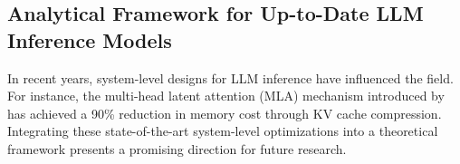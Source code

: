 \subsection{Analytical Framework for Up-to-Date LLM Inference Models}
In recent years, system-level designs for LLM inference have influenced the field. For instance, the multi-head latent attention (MLA) mechanism introduced by \cite{deepseekai2024deepseekv2strongeconomicalefficient} has achieved a 90\% reduction in memory cost through KV cache compression. Integrating these state-of-the-art system-level optimizations into a theoretical framework presents a promising direction for future research.
